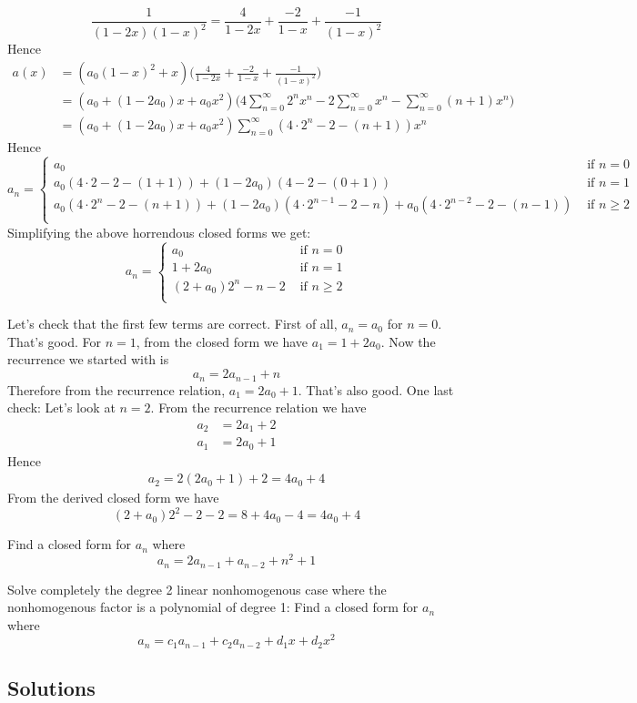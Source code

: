 \[
\frac{1}{(1-2x)(1-x)^2}
= 
\frac{4}{1-2x}
+
\frac{-2}{1-x}
+
\frac{-1}{(1-x)^2}
\]
Hence
\begin{align*}
a(x) 
&= 
(a_0(1-x)^2 + x) 
\biggl(
\frac{4}{1-2x}
+
\frac{-2}{1-x}
+
\frac{-1}{(1-x)^2}
\biggr) \\
&= 
(a_0 + (1-2a_0)x + a_0 x^2) 
\biggl(
4 \sum_{n=0}^\infty 2^n x^n
-2 \sum_{n=0}^\infty x^n
- \sum_{n=0}^\infty (n+1) x^n
\biggr) \\
&= 
(a_0 + (1-2a_0)x + a_0 x^2) 
\sum_{n=0}^\infty (4 \cdot 2^n - 2 - (n+1))x^n
\end{align*}
Hence 
\[
a_n = 
\begin{cases}
a_0 &\text{ if } n = 0 \\
%
a_0(4 \cdot 2 - 2 - (1+1)) + (1-2a_0)(4 - 2 - (0+1)) &\text{ if } n = 1 \\
%
a_0(4 \cdot 2^n - 2 - (n+1)) + (1-2a_0)(4 \cdot 2^{n-1} - 2 - n) +
a_0(4 \cdot 2^{n-2} - 2 - (n-1))
& \text{ if } n \geq 2 \\
\end{cases}
\]
Simplifying the above horrendous closed forms we get:
\[
a_n = 
\begin{cases}
a_0 &\text{ if } n = 0 \\
%
1 + 2a_0 &\text{ if } n = 1 \\
%
(2 + a_0)2^n - n  -2 & \text{ if } n \geq 2 \\
\end{cases}
\]

Let's check that the first few terms are correct.
First of all, $a_n = a_0$ for $n = 0$.
That's good.
For $n = 1$, from the closed form we have $a_1 = 1 + 2a_0$.
Now the recurrence we started with is
\[
a_n = 2a_{n-1} + n
\]
Therefore from the recurrence relation, $a_1 = 2a_0 + 1$.
That's also good.
One last check: Let's look at $n = 2$.
From the recurrence relation we have
\begin{align*}
a_2 &= 2a_1 + 2 \\
a_1 &= 2a_0 + 1
\end{align*}
Hence
\begin{align*}
a_2 = 2(2a_0 + 1) + 2 = 4a_0 + 4
\end{align*}
From the derived closed form we have
\[
(2 + a_0)2^2 - 2 - 2 = 8 + 4a_0 - 4 = 4a_0 + 4
\]



\newpage
\begin{ex}
Find a closed form for $a_n$ where
\[
a_n = 2a_{n-1} + a_{n-2} + n^2 + 1
\]
\end{ex}


\newpage
\begin{ex}
Solve completely the degree 2 linear nonhomogenous case
where the nonhomogenous factor is a polynomial of degree 1:
Find a closed form for $a_n$ where
\[
a_n = c_1 a_{n-1} + c_2 a_{n-2} + d_1x + d_2 x^2
\]
\end{ex}

\newpage
\subsection*{Solutions}

